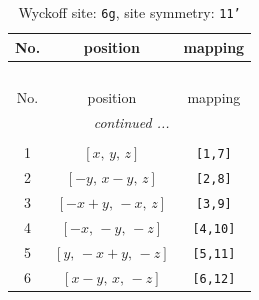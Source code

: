 \documentclass[fleqn,8pt]{jsarticle}
\begin{document}
\begin{longtable}{ccc}
\caption{Wyckoff site: {\tt 6g}, site symmetry: {\tt 11'}}
 \\
 \hline \hline
No. & position & mapping \\ \hline \endfirsthead

\multicolumn{2}{l}{\tablename\ \thetable{}} \\
 \hline \hline
No. & position & mapping \\ \hline \endhead

 \hline \hline
\multicolumn{2}{r}{\footnotesize\it continued ...} \\ \endfoot

 \hline \hline
\multicolumn{2}{r}{} \\ \endlastfoot

1 & $\left[ x,\, y,\, z \right]$ & {\tt [1,7]} \\ \hline
2 & $\left[ - y,\, x - y,\, z \right]$ & {\tt [2,8]} \\ \hline
3 & $\left[ - x + y,\, - x,\, z \right]$ & {\tt [3,9]} \\ \hline
4 & $\left[ - x,\, - y,\, - z \right]$ & {\tt [4,10]} \\ \hline
5 & $\left[ y,\, - x + y,\, - z \right]$ & {\tt [5,11]} \\ \hline
6 & $\left[ x - y,\, x,\, - z \right]$ & {\tt [6,12]} \\
\end{longtable}
\end{document}
